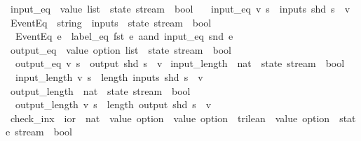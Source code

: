 \begin{isabellebody}
%
\isadelimproof
\isanewline
%
\endisadelimproof
\isanewline
{}\isamarkupfalse%
\ input_eq\ {\isacharcolon}{\isacharcolon}\ {\isachardoublequoteopen}value\ list\ {\isasymRightarrow}\ state\ stream\ {\isasymRightarrow}\ bool{\isachardoublequoteclose}\ \isanewline
\ \ {\isachardoublequoteopen}input_eq\ v\ s\ {\isasymequiv}\ inputs\ {\isacharparenleft}shd\ s{\isacharparenright}\ {\isacharequal}\ v{\isachardoublequoteclose}\isanewline
\isanewline
{}\isamarkupfalse%
\ EventEq\ {\isacharcolon}{\isacharcolon}\ {\isachardoublequoteopen}{\isacharparenleft}string\ {\isasymtimes}\ inputs{\isacharparenright}\ {\isasymRightarrow}\ state\ stream\ {\isasymRightarrow}\ bool{\isachardoublequoteclose}\ \isanewline
\ \ {\isachardoublequoteopen}EventEq\ e\ {\isacharequal}\ label_eq\ {\isacharparenleft}fst\ e{\isacharparenright}\ aand\ input_eq\ {\isacharparenleft}snd\ e{\isacharparenright}{\isachardoublequoteclose}\isanewline
\isanewline
{}\isamarkupfalse%
\ output_eq\ {\isacharcolon}{\isacharcolon}\ {\isachardoublequoteopen}value\ option\ list\ {\isasymRightarrow}\ state\ stream\ {\isasymRightarrow}\ bool{\isachardoublequoteclose}\ \isanewline
\ \ {\isachardoublequoteopen}output_eq\ v\ s\ {\isasymequiv}\ output\ {\isacharparenleft}shd\ s{\isacharparenright}\ {\isacharequal}\ v{\isachardoublequoteclose}\isanewline
\isanewline
{}\isamarkupfalse%
\ input_length\ {\isacharcolon}{\isacharcolon}\ {\isachardoublequoteopen}nat\ {\isasymRightarrow}\ state\ stream\ {\isasymRightarrow}\ bool{\isachardoublequoteclose}\ \isanewline
\ \ {\isachardoublequoteopen}input_length\ v\ s\ {\isasymequiv}\ length\ {\isacharparenleft}inputs\ {\isacharparenleft}shd\ s{\isacharparenright}{\isacharparenright}\ {\isacharequal}\ v{\isachardoublequoteclose}\isanewline
\isanewline
{}\isamarkupfalse%
\ output_length\ {\isacharcolon}{\isacharcolon}\ {\isachardoublequoteopen}nat\ {\isasymRightarrow}\ state\ stream\ {\isasymRightarrow}\ bool{\isachardoublequoteclose}\ \isanewline
\ \ {\isachardoublequoteopen}output_length\ v\ s\ {\isasymequiv}\ length\ {\isacharparenleft}output\ {\isacharparenleft}shd\ s{\isacharparenright}{\isacharparenright}\ {\isacharequal}\ v{\isachardoublequoteclose}\isanewline
\isanewline
{}\isamarkupfalse%
\ {\isachardoublequoteopen}check_inx{\isachardoublequoteclose}\ {\isacharcolon}{\isacharcolon}\ {\isachardoublequoteopen}ior\ {\isasymRightarrow}\ nat\ {\isasymRightarrow}\ {\isacharparenleft}value\ option\ {\isasymRightarrow}\ value\ option\ {\isasymRightarrow}\ trilean{\isacharparenright}\ {\isasymRightarrow}\ value\ option\ {\isasymRightarrow}\ state\ stream\ {\isasymRightarrow}\ bool{\isachardoublequoteclose}\ \isanewline

\end{isabellebody}
